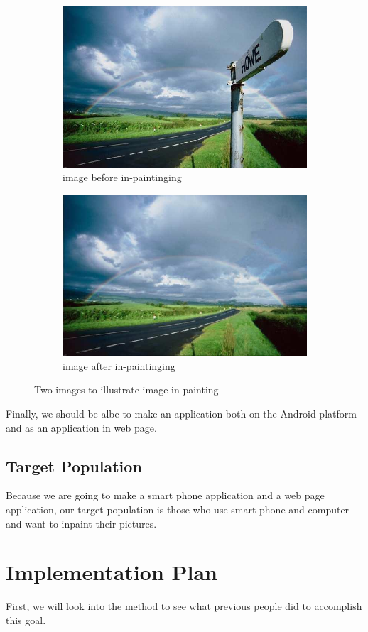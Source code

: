 \documentclass[12pt]{article}
\begin{document}
\begin{figure}[H]
	\begin{subfigure}[pos]{.5\textwidth}
		\centering
		\includegraphics*[width=0.8\linewidth]{1.jpg}
		\caption{image before in-paintinging}
	\end{subfigure}%
	\begin{subfigure}[pos]{.5\textwidth}
		\centering
		\includegraphics*[width=0.8\linewidth]{2.jpg}
		\caption{image after in-paintinging}
	\end{subfigure}%
	\caption{Two images to illustrate image in-painting}
\end{figure}
 
\qquad Finally, we should be albe to make an application both on the Android platform and as an application in web page.
\subsection{Target Population}
\qquad Because we are going to make a smart phone application and a web page application, our target population is those who use smart phone and computer and want to inpaint their pictures.
\section{Implementation Plan}
\qquad First, we will look into the method to see what previous people did to accomplish this goal. 
\end{document}
